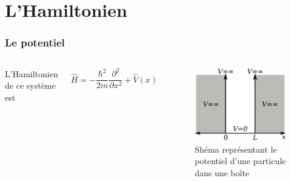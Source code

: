 \documentclass[aspectratio=169]{beamer}
\begin{document}
\section{L'Hamiltonien}
\begin{frame}
\frametitle{Le potentiel}

\begin{columns}
L'Hamiltonien de ce système est

\begin{equation}\tag{2}
\hat{H}=-\frac{\hbar^2}{2m}\frac{\partial^2}{\partial x^2}+\hat{V}(x)
\end{equation} 

\begin{figure}
\includegraphics[scale=0.4]{Pot}
\caption{Shéma représentant le potentiel d'une particule dans une boîte}
\end{figure}
\end{columns}

\end{frame}
\end{document}
